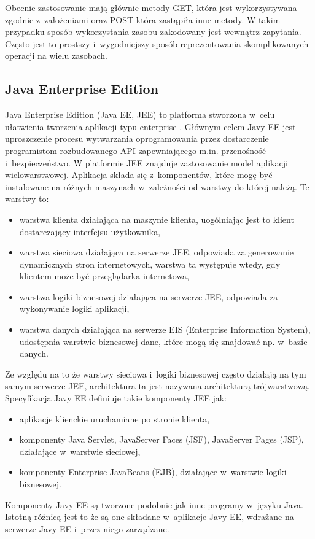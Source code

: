 	

Obecnie zastosowanie mają głównie metody GET, która jest wykorzystywana zgodnie z~założeniami oraz POST która zastąpiła inne metody. W takim przypadku sposób wykorzystania zasobu zakodowany jest wewnątrz zapytania. Często jest to prostszy i~wygodniejszy sposób reprezentowania skomplikowanych operacji na wielu zasobach. 



\subsection{Java Enterprise Edition}
Java Enterprise Edition (Java EE, JEE) to platforma stworzona w~celu ułatwienia tworzenia aplikacji typu enterprise \cite{javaEE}. Głównym celem Javy EE jest uproszczenie procesu wytwarzania oprogramowania przez dostarczenie programistom rozbudowanego API zapewniającego m.in. przenośność i~bezpieczeństwo. W platformie JEE znajduje zastosowanie model aplikacji wielowarstwowej. Aplikacja składa się z~komponentów, które mogę być instalowane na różnych maszynach w~zależności od warstwy do której należą. Te warstwy to:
\begin{itemize}
	\item warstwa klienta działająca na maszynie klienta, uogólniając jest to klient dostarczający interfejsu użytkownika,
	\item warstwa sieciowa działająca na serwerze JEE, odpowiada za generowanie dynamicznych stron internetowych, warstwa ta występuje wtedy, gdy klientem może być przeglądarka internetowa,
	\item warstwa logiki biznesowej działająca na serwerze JEE, odpowiada za wykonywanie logiki aplikacji,
	\item warstwa danych działająca na serwerze EIS (Enterprise Information
                System), udostępnia warstwie biznesowej dane, które
                mogą się znajdować np. w~bazie danych.
\end{itemize}
Ze względu na to że warstwy sieciowa i~logiki biznesowej często działają na tym samym serwerze JEE, architektura ta jest nazywana architekturą trójwarstwową.
Specyfikacja Javy EE definiuje takie komponenty JEE jak:
\begin{itemize}
	\item aplikacje klienckie uruchamiane po stronie klienta,
	\item komponenty Java Servlet, JavaServer Faces (JSF), JavaServer Pages (JSP), działające w~warstwie sieciowej,
	\item komponenty Enterprise JavaBeans (EJB), działające w~warstwie logiki biznesowej.
\end{itemize}
Komponenty Javy EE są tworzone podobnie jak inne programy w~języku Java. Istotną różnicą jest to że są one składane w~aplikacje Javy EE, wdrażane na serwerze Javy EE i~przez niego zarządzane.
